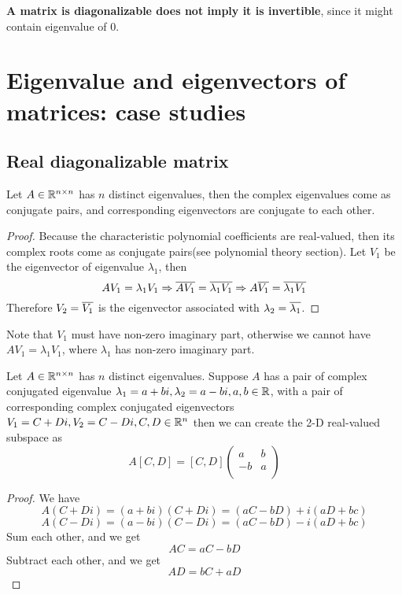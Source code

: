 \begin{refsection}
\begin{remark}
	\textbf{A matrix is diagonalizable does not imply it is invertible}, since it might contain eigenvalue of 0.
\end{remark}

\section{Eigenvalue and eigenvectors of matrices: case studies}
\subsection{Real diagonalizable matrix}
\begin{theorem}
Let $A\in \mathbb{R}^{n\times n}$ has $n$ distinct eigenvalues, then the complex eigenvalues come as conjugate pairs, and corresponding eigenvectors are conjugate to each other.
\end{theorem}
\begin{proof}
Because the characteristic polynomial coefficients are real-valued, then its complex roots come as conjugate pairs(see polynomial theory section). Let $V_1$ be the eigenvector of eigenvalue $\lambda_1$, then
$$AV_1 = \lambda_1 V_1 \Rightarrow \overline{AV_1} = \overline{\lambda_1 V_1} \Rightarrow A\overline{V_1} = \overline{\lambda_1}\overline{V_1}$$
Therefore $V_2 = \overline{V_1}$ is the eigenvector associated with $\lambda_2 = \overline{\lambda_1}$. 
\end{proof}

\begin{remark}
Note that $V_1$ must have non-zero imaginary part, otherwise we cannot have $AV_1 = \lambda_1V_1$, where $\lambda_1$ has non-zero imaginary part.
\end{remark}

\begin{theorem}
Let $A\in \mathbb{R}^{n\times n}$ has $n$ distinct eigenvalues. Suppose $A$ has a pair of complex conjugated eigenvalue $\lambda_1 = a+bi,\lambda_2=a-bi,a,b\in \mathbb{R}$, with a pair of corresponding complex conjugated eigenvectors $V_1=C+Di,V_2=C-Di,C,D \in \mathbb{R}^n$
then we can create the 2-D real-valued subspace as
$$A[C, D] = [C, D]\begin{pmatrix}
a & b\\
-b & a\\
\end{pmatrix} $$
\end{theorem}
\begin{proof}
We have 
$$A(C + Di) = (a+bi)(C+Di) = (aC-bD) + i(aD + bc)$$
$$A(C - Di) = (a-bi)(C-Di) = (aC-bD) - i(aD + bc)$$
Sum each other, and we get
$$AC = aC-bD$$
Subtract each other, and we get
$$AD = bC+aD$$
\end{proof}



\end{refsection}
